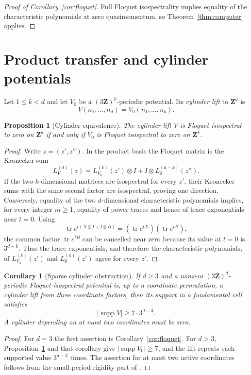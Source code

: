 \documentclass[11pt,reqno]{amsart}
\newtheorem{proposition}[theorem]{Proposition}
\newtheorem{corollary}[theorem]{Corollary}
\theoremstyle{definition}
\theoremstyle{remark}
\DeclareMathOperator{\supp}{supp}
\DeclareMathOperator{\tr}{tr}
\newcommand{\Z}{\mathbf Z}
\begin{document}
\begin{proof}[Proof of Corollary~\ref{cor:floquet}]
Full Floquet isospectrality implies equality of the characteristic
polynomials at zero quasimomentum, so Theorem~\ref{thm:computer} applies.
\end{proof}

\section{Product transfer and cylinder potentials}

Let $1\leq k<d$ and let $V_0$ be a $(3\Z)^k$-periodic potential.  Its
\emph{cylinder lift} to $\Z^d$ is
\[
 V(n_1,\ldots,n_d)=V_0(n_1,\ldots,n_k).
\]

\begin{proposition}[Cylinder equivalence]\label{prop:cylinder}
The cylinder lift $V$ is Floquet isospectral to zero on $\Z^d$ if and only
if $V_0$ is Floquet isospectral to zero on $\Z^k$.
\end{proposition}

\begin{proof}
Write $z=(z',z'')$.  In the product basis the Floquet matrix is the
Kronecker sum
\[
 L_V^{(d)}(z)=L_{V_0}^{(k)}(z')\otimes I
             +I\otimes L_0^{(d-k)}(z'').
\]
If the two $k$-dimensional matrices are isospectral for every $z'$, their
Kronecker sums with the same second factor are isospectral, proving one
direction.  Conversely, equality of the two $d$-dimensional characteristic
polynomials implies, for every integer $m\geq1$, equality of power traces
and hence of trace exponentials near $t=0$.  Using
\[
 \tr e^{t(X\otimes I+I\otimes B)}
   =(\tr e^{tX})(\tr e^{tB}),
\]
the common factor $\tr e^{tB}$ can be cancelled near zero because its value
at $t=0$ is $3^{d-k}$.  Thus the trace exponentials, and therefore the
characteristic polynomials, of $L_{V_0}^{(k)}(z')$ and $L_0^{(k)}(z')$
agree for every $z'$.
\end{proof}

\begin{corollary}[Sparse cylinder obstruction]\label{cor:cylinder}
If $d\geq3$ and a nonzero $(3\Z)^d$-periodic Floquet-isospectral potential
is, up to a coordinate permutation, a cylinder lift from three coordinate
factors, then its support in a fundamental cell satisfies
\[
 |\supp V|\geq7\cdot3^{d-3}.
\]
A cylinder depending on at most two coordinates must be zero.
\end{corollary}

\begin{proof}
For $d=3$ the first assertion is Corollary~\ref{cor:floquet}.  For $d>3$,
Proposition~\ref{prop:cylinder} and that corollary give
$|\supp V_0|\geq7$, and the lift repeats each supported value $3^{d-3}$
times.  The assertion for at most two active coordinates follows from the
small-period rigidity part of \cite[Theorem~C]{cobb2026}.
\end{proof}
\end{document}
